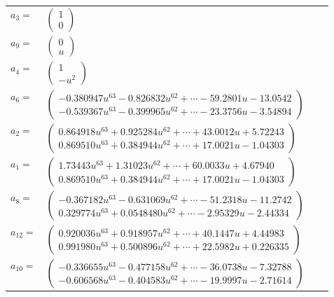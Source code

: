 \documentclass[1p]{elsarticle_modified}
\theoremstyle{definition}
\begin{document}
\begin{tabular}{m{7pt} m{180pt} m{7pt} m{180pt} }
\flushright $a_{3}=$&$\begin{pmatrix}1\\0\end{pmatrix}$ \\
\flushright $a_{9}=$&$\begin{pmatrix}0\\u\end{pmatrix}$ \\
\flushright $a_{4}=$&$\begin{pmatrix}1\\- u^2\end{pmatrix}$ \\
\flushright $a_{6}=$&$\begin{pmatrix}-0.380947 u^{63}-0.826832 u^{62}+\cdots-59.2801 u-13.0542\\-0.539367 u^{63}-0.399965 u^{62}+\cdots-23.3756 u-3.54894\end{pmatrix}$ \\
\flushright $a_{2}=$&$\begin{pmatrix}0.864918 u^{63}+0.925284 u^{62}+\cdots+43.0012 u+5.72243\\0.869510 u^{63}+0.384944 u^{62}+\cdots+17.0021 u-1.04303\end{pmatrix}$ \\
\flushright $a_{1}=$&$\begin{pmatrix}1.73443 u^{63}+1.31023 u^{62}+\cdots+60.0033 u+4.67940\\0.869510 u^{63}+0.384944 u^{62}+\cdots+17.0021 u-1.04303\end{pmatrix}$ \\
\flushright $a_{8}=$&$\begin{pmatrix}-0.367182 u^{63}-0.631069 u^{62}+\cdots-51.2318 u-11.2742\\0.329774 u^{63}+0.0548480 u^{62}+\cdots-2.95329 u-2.44334\end{pmatrix}$ \\
\flushright $a_{12}=$&$\begin{pmatrix}0.920036 u^{63}+0.918957 u^{62}+\cdots+40.1447 u+4.44983\\0.991980 u^{63}+0.500896 u^{62}+\cdots+22.5982 u+0.226335\end{pmatrix}$ \\
\flushright $a_{10}=$&$\begin{pmatrix}-0.336655 u^{63}-0.477158 u^{62}+\cdots-36.0738 u-7.32788\\-0.606568 u^{63}-0.404583 u^{62}+\cdots-19.9997 u-2.71614\end{pmatrix}$ \\

\end{tabular}
\end{document}
